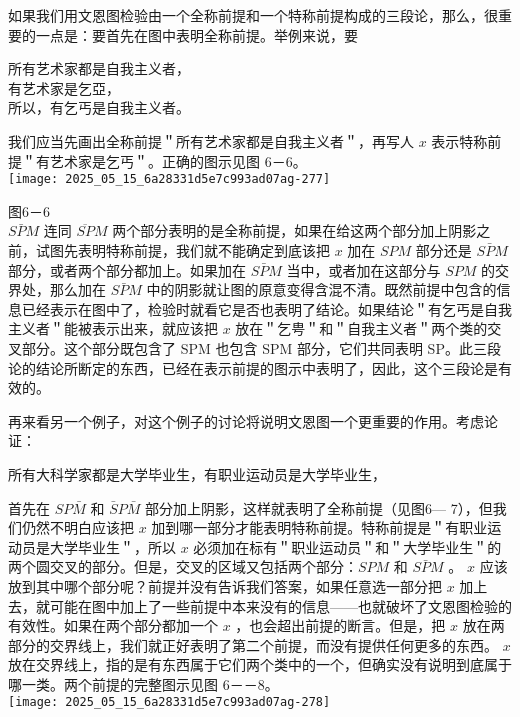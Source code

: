 如果我们用文恩图检验由一个全称前提和一个特称前提构成的三段论，那么，很重要的一点是：要首先在图中表明全称前提。举例来说，要

所有艺术家都是自我主义者，\\
有艺术家是乞亞，\\
所以，有乞丐是自我主义者。

我们应当先画出全称前提＂所有艺术家都是自我主义者＂，再写人 $x$ 表示特称前提＂有艺术家是乞丐＂。正确的图示见图 6－6。\\
\texttt{[image: 2025\_05\_15\_6a28331d5e7c993ad07ag-277]}

图6－6\\
$S \bar{P} M$ 连同 $\overline{S P} M$ 两个部分表明的是全称前提，如果在给这两个部分加上阴影之前，试图先表明特称前提，我们就不能确定到底该把 $x$ 加在 $S P M$ 部分还是 $S \bar{P} M$ 部分，或者两个部分都加上。如果加在 $S \bar{P} M$ 当中，或者加在这部分与 $S P M$ 的交界处，那么加在 $S \bar{P} M$ 中的阴影就让图的原意变得含混不清。既然前提中包含的信息已经表示在图中了，检验时就看它是否也表明了结论。如果结论＂有乞丐是自我主义者＂能被表示出来，就应该把 $x$ 放在＂乞甹＂和＂自我主义者＂两个类的交叉部分。这个部分既包含了 SPM 也包含 SPM 部分，它们共同表明 SP。此三段论的结论所断定的东西，已经在表示前提的图示中表明了，因此，这个三段论是有效的。

再来看另一个例子，对这个例子的讨论将说明文恩图一个更重要的作用。考虑论证：

\begin{displayquote}
所有大科学家都是大学毕业生，有职业运动员是大学毕业生，
\end{displayquote}

首先在 $S P \bar{M}$ 和 $\bar{S} P \bar{M}$ 部分加上阴影，这样就表明了全称前提（见图6— 7），但我们仍然不明白应该把 $x$ 加到哪一部分才能表明特称前提。特称前提是＂有职业运动员是大学毕业生＂，所以 $x$ 必须加在标有＂职业运动员＂和＂大学毕业生＂的两个圆交叉的部分。但是，交叉的区域又包括两个部分：$S P M$ 和 $S \bar{P} M$ 。 $x$ 应该放到其中哪个部分呢？前提并没有告诉我们答案，如果任意选一部分把 $x$ 加上去，就可能在图中加上了一些前提中本来没有的信息——也就破坏了文恩图检验的有效性。如果在两个部分都加一个 $x$ ，也会超出前提的断言。但是，把 $x$ 放在两部分的交界线上，我们就正好表明了第二个前提，而没有提供任何更多的东西。 $x$ 放在交界线上，指的是有东西属于它们两个类中的一个，但确实没有说明到底属于哪一类。两个前提的完整图示见图 6－－8。\\
\texttt{[image: 2025\_05\_15\_6a28331d5e7c993ad07ag-278]}

